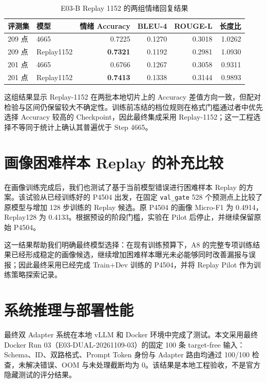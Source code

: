 \documentclass[UTF8,a4paper,zihao=-4,oneside]{ctexrep}
\begin{document}
\begin{table}[htbp]\centering\caption{E03-B Replay 1152 的两组情绪回复结果}\label{tab:e03b-replay}
\small
\begin{tabular}{p{1.9cm}p{2.8cm}rrrr}
\toprule
评测集 & 模型 & 情绪 Accuracy & BLEU-4 & ROUGE-L & 长度比\\\midrule
209 点 & 4665 & 0.7225 & 0.1270 & 0.3018 & 1.0262\\
209 点 & Replay1152 & \textbf{0.7321} & 0.1192 & 0.2981 & 1.0930\\
201 点 & 4665 & 0.6766 & 0.1267 & 0.3058 & 0.9311\\
201 点 & Replay1152 & \textbf{0.7413} & 0.1338 & 0.3144 & 0.9893\\
\bottomrule
\end{tabular}
\end{table}

这组结果显示 Replay-1152 在两批本地切片上的 Accuracy 差值方向一致，但配对检验与区间仍保留较大不确定性。训练前冻结的档位规则在格式门槛通过者中优先选择 Accuracy 较高的 Checkpoint，因此最终集成采用 Replay-1152；这一工程选择不等同于统计上确认其普遍优于 Step 4665。

\section{画像困难样本 Replay 的补充比较}
在画像训练完成后，我们也测试了基于当前模型错误进行困难样本 Replay 的方案。该试验从已经训练好的 P4504 出发，在固定 \texttt{val\_gate} 528 个预测点上比较了原模型与增加 128 步训练的 Replay 候选。原 P4504 的画像 Micro-F1 为 0.4914，Replay128 为 0.4133。根据预设的阶段门槛，实验在 Pilot 后停止，并继续保留原始 P4504。

这一结果帮助我们明确最终模型选择：在现有训练预算下，A8 的完整专项训练结果已经形成稳定的画像候选，继续增加困难样本曝光未必能够同时改善漏报与误报；因此最终采用已经完成 Train+Dev 训练的 P4504，并将 Replay Pilot 作为训练策略探索记录。

\section{系统推理与部署性能}
最终双 Adapter 系统在本地 vLLM 和 Docker 环境中完成了测试。本文采用最终 Docker Run 03（E03-DUAL-20261109-03）的固定 100 条 target-free 输入：Schema、ID、双路格式、Prompt Token 身份与 Adapter 路由均通过 100/100 检查，未解决错误、OOM 与未处理截断均为 0。该结果是本地工程验收，不是官方隐藏测试的评分结果。
\end{document}
